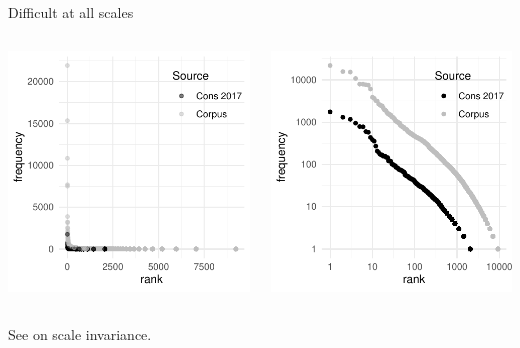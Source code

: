 \documentclass{hertieteaching}\usepackage[]{graphicx}\usepackage[]{color}
\begin{document}
\begin{frame}{Difficult at all scales}




\begin{columns}[T,onlytextwidth]

\centerline{\includegraphics[scale=0.7]{figures/allscalesorig}}


\centerline{\includegraphics[scale=0.7]{figures/allscaleslog}}

\end{columns}

See \textcite{Chater.Brown1999} on scale invariance.

\end{frame}
\end{document}
